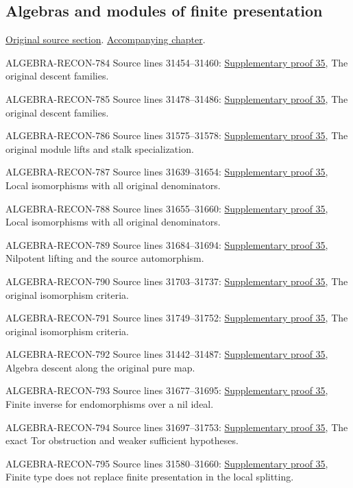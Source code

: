 \subsection{Algebras and modules of finite presentation}
\hypertarget{algebra-source-section-finite-presentation}{}
\noindent\href{https://github.com/stacks/stacks-project/blob/a04446e57ec1fbc252a871afcec7752fb2807b14/algebra.tex\#L31434}{Original source section}. \href{algebra.pdf\#nameddest=section-finite-presentation}{Accompanying chapter}.

\begin{AlgebraSourceRoutes}
\item[ALGEBRA-RECON-784] Source lines 31454--31460: \hyperlink{algebra_finite_presentation_notes_20260928}{Supplementary proof 35}, The original descent families.
\item[ALGEBRA-RECON-785] Source lines 31478--31486: \hyperlink{algebra_finite_presentation_notes_20260928}{Supplementary proof 35}, The original descent families.
\item[ALGEBRA-RECON-786] Source lines 31575--31578: \hyperlink{algebra_finite_presentation_notes_20260928}{Supplementary proof 35}, The original module lifts and stalk specialization.
\item[ALGEBRA-RECON-787] Source lines 31639--31654: \hyperlink{algebra_finite_presentation_notes_20260928}{Supplementary proof 35}, Local isomorphisms with all original denominators.
\item[ALGEBRA-RECON-788] Source lines 31655--31660: \hyperlink{algebra_finite_presentation_notes_20260928}{Supplementary proof 35}, Local isomorphisms with all original denominators.
\item[ALGEBRA-RECON-789] Source lines 31684--31694: \hyperlink{algebra_finite_presentation_notes_20260928}{Supplementary proof 35}, Nilpotent lifting and the source automorphism.
\item[ALGEBRA-RECON-790] Source lines 31703--31737: \hyperlink{algebra_finite_presentation_notes_20260928}{Supplementary proof 35}, The original isomorphism criteria.
\item[ALGEBRA-RECON-791] Source lines 31749--31752: \hyperlink{algebra_finite_presentation_notes_20260928}{Supplementary proof 35}, The original isomorphism criteria.
\item[ALGEBRA-RECON-792] Source lines 31442--31487: \hyperlink{algebra_finite_presentation_notes_20260928}{Supplementary proof 35}, Algebra descent along the original pure map.
\item[ALGEBRA-RECON-793] Source lines 31677--31695: \hyperlink{algebra_finite_presentation_notes_20260928}{Supplementary proof 35}, Finite inverse for endomorphisms over a nil ideal.
\item[ALGEBRA-RECON-794] Source lines 31697--31753: \hyperlink{algebra_finite_presentation_notes_20260928}{Supplementary proof 35}, The exact Tor obstruction and weaker sufficient hypotheses.
\item[ALGEBRA-RECON-795] Source lines 31580--31660: \hyperlink{algebra_finite_presentation_notes_20260928}{Supplementary proof 35}, Finite type does not replace finite presentation in the local splitting.
\end{AlgebraSourceRoutes}

